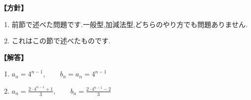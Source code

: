     \noindent\textbf{【方針】}
    \begin{enumerate}[label=(\arabic*),parsep=3pt]
      \item 前節で述べた問題です.一般型,加減法型,どちらのやり方でも問題ありません.
      \item これはこの節で述べたものです.
    \end{enumerate}

    \noindent\textbf{【解答】}
    \begin{enumerate}[label=(\arabic*),parsep=3pt]
      \item $\displaystyle a_n=4^{n-1},\qquad b_n=a_n=4^{n-1}$
      \item $\displaystyle a_n=\frac{2\cdot4^{n-1}+1}{3},\qquad b_n=\frac{2\cdot4^{n-1}-2}{3}$
    \end{enumerate}


